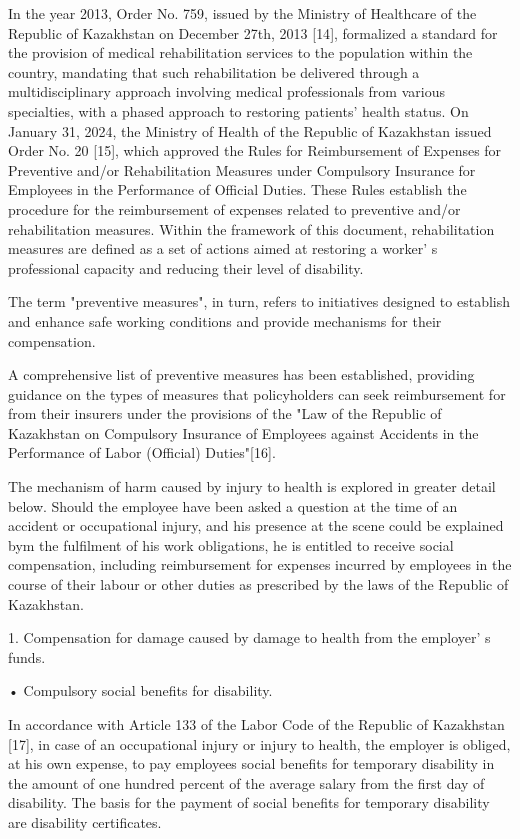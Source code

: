 \begin{multicols}{2}
In the year 2013, Order No. 759, issued by the Ministry of Healthcare of
the Republic of Kazakhstan on December 27th, 2013 {[}14{]}, formalized a
standard for the provision of medical rehabilitation services to the
population within the country, mandating that such rehabilitation be
delivered through a multidisciplinary approach involving medical
professionals from various specialties, with a phased approach to
restoring patients'{} health status. On January 31, 2024,
the Ministry of Health of the Republic of Kazakhstan issued Order No. 20
{[}15{]}, which approved the Rules for Reimbursement of Expenses for
Preventive and/or Rehabilitation Measures under Compulsory Insurance for
Employees in the Performance of Official Duties. These Rules establish
the procedure for the reimbursement of expenses related to preventive
and/or rehabilitation measures. Within the framework of this document,
rehabilitation measures are defined as a set of actions aimed at
restoring a worker' s professional capacity and reducing
their level of disability.

The term "preventive measures", in turn, refers to initiatives designed
to establish and enhance safe working conditions and provide mechanisms
for their compensation.

A comprehensive list of preventive measures has been established,
providing guidance on the types of measures that policyholders can seek
reimbursement for from their insurers under the provisions of the "Law
of the Republic of Kazakhstan on Compulsory Insurance of Employees
against Accidents in the Performance of Labor (Official)
Duties"{[}16{]}.

The mechanism of harm caused by injury to health is explored in greater
detail below. Should the employee have been asked a question at the time
of an accident or occupational injury, and his presence at the scene
could be explained bym the fulfilment of his work obligations, he is
entitled to receive social compensation, including reimbursement for
expenses incurred by employees in the course of their labour or other
duties as prescribed by the laws of the Republic of Kazakhstan.

1. Compensation for damage caused by damage to health from the
employer' s funds.

• Compulsory social benefits for disability.

In accordance with Article 133 of the Labor Code of the Republic of
Kazakhstan {[}17{]}, in case of an occupational injury or injury to
health, the employer is obliged, at his own expense, to pay employees
social benefits for temporary disability in the amount of one hundred
percent of the average salary from the first day of disability. The
basis for the payment of social benefits for temporary disability are
disability certificates.


\end{multicols}
